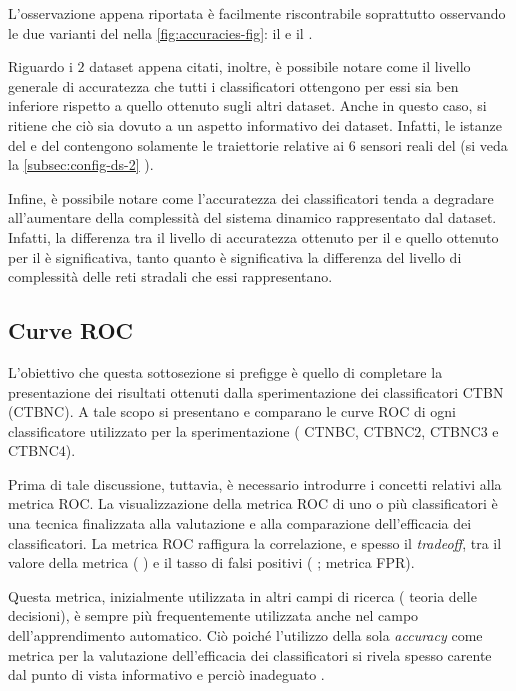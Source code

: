 L'osservazione appena riportata è facilmente riscontrabile soprattutto osservando le due varianti del  nella \autoref{fig:accuracies-fig}: il  e il .

Riguardo i $2$ dataset appena citati, inoltre, è possibile notare come il livello generale di accuratezza che tutti i classificatori ottengono per essi sia ben inferiore rispetto a quello ottenuto sugli altri dataset. Anche in questo caso, si ritiene che ciò sia dovuto a un aspetto informativo dei dataset. Infatti, le istanze del  e del  contengono solamente le traiettorie relative ai $6$ sensori reali del  (si veda la \autoref{subsec:config-ds-2} ).

Infine, è possibile notare come l'accuratezza dei classificatori tenda a degradare all'aumentare della complessità del sistema dinamico rappresentato dal dataset. Infatti, la differenza tra il livello di accuratezza ottenuto per il  e quello ottenuto per il  è significativa, tanto quanto è significativa la differenza del livello di complessità delle reti stradali che essi rappresentano.

\subsection{Curve ROC}
L'obiettivo che questa sottosezione si prefigge è quello di completare la presentazione dei risultati ottenuti dalla sperimentazione dei classificatori \acs{CTBN} (\acs{CTBNC}). A tale scopo si presentano e comparano le curve \acf{ROC} di ogni classificatore utilizzato per la sperimentazione (\ie{} \acs{CTNBC}, \acs{CTBNC}$2$, \acs{CTBNC}$3$ e \acs{CTBNC}$4$).

Prima di tale discussione, tuttavia, è necessario introdurre i concetti relativi alla metrica \acs{ROC}. La visualizzazione della metrica \acs{ROC} di uno o più classificatori è una tecnica finalizzata alla valutazione e alla comparazione dell'efficacia dei classificatori. La metrica \acs{ROC} raffigura la correlazione, e spesso il \emph{tradeoff}, tra il valore della metrica \emph{} (\ie{} \emph{}) e il tasso di falsi positivi (\ie{} \emph{}; metrica \acs{FPR}).

Questa metrica, inizialmente utilizzata in altri campi di ricerca (\eg{} teoria delle decisioni), è sempre più frequentemente utilizzata anche nel campo dell'apprendimento automatico. Ciò poiché l'utilizzo della sola \emph{accuracy} come metrica per la valutazione dell'efficacia dei classificatori si rivela spesso carente dal punto di vista informativo e perciò inadeguato \citep[per approfondimenti si veda][]{Provost1997,Provost2001}.


